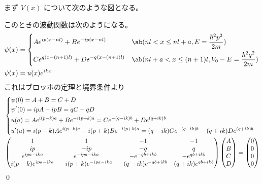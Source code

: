 \documentclass[uplatex,dvipdfmx,a4paper,11pt]{jlreq}
\makeatletter
\numberwithin{equation}{section}
\theoremstyle{definition}
\renewenvironment{proof}[1][\proofname]{\par
  \normalfont
  \topsep6\p@\@plus6\p@ \trivlist
  \item[\hskip\labelsep{\bfseries #1}\@addpunct{\bfseries}]\ignorespaces\quad\par
}{%
  \qed\endtrivlist\@endpefalse
}
\renewcommand\proofname{証明}
\makeatother
\begin{document}
\begin{proof}
  まず $V(x)$ について次のような図となる。

  このときの波動関数は次のようになる。
  \begin{align}
    \psi(x) & = \begin{dcases}
                  Ae^{ip(x - nl)} + Be^{-ip(x - nl)}           & \ab(nl < x \leq nl + a, E = \frac{\hbar^2p^2}{2m})             \\
                  Ce^{q(x - (n + 1)l)} + De^{-q(x - (n + 1)l)} & \ab(nl + a < x \leq (n + 1)l, V_0 - E = \frac{\hbar^2q^2}{2m})
                \end{dcases} \\
    \psi(x) & = u(x)e^{ikx}
  \end{align}
  これはブロッホの定理と境界条件より
  \begin{align}
     & \begin{dcases}
         \psi(0) = A + B = C + D                                                    \\
         \psi'(0) = ipA - ipB = qC - qD                                             \\
         u(a) = Ae^{i(p - k)a} + Be^{-i(p + k)a} = Ce^{-(q - ik)b} + De^{(q + ik)b} \\
         u'(a) = i(p - k)Ae^{i(p - k)a} - i(p + k)Be^{-i(p + k)a} = (q - ik)Ce^{-(q - ik)b} - (q + ik)De^{(q + ik)b}
       \end{dcases} \\
     & \begin{pmatrix}
         1                     & 1                        & -1                     & -1                   \\
         ip                    & -ip                      & -q                     & q                    \\
         e^{ipa - ika}         & e^{-ipa - ika}           & -e^{-qb + ikb}         & -e^{qb + ikb}        \\
         i(p - k)e^{ipa - ika} & - i(p + k)e^{-ipa - ika} & -(q - ik)e^{-qb + ikb} & (q + ik)e^{qb + ikb}
       \end{pmatrix}
    \begin{pmatrix}
      A \\ B \\ C \\ D
    \end{pmatrix}
    =
    \begin{pmatrix}
      0 \\ 0 \\ 0 \\ 0

\end{pmatrix}
\end{align}
\end{proof}
\end{document}

